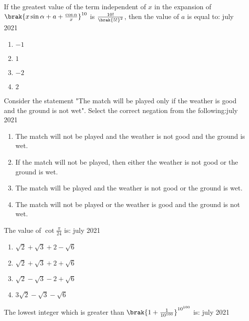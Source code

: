     \item If the greatest value of the term independent of $x$ in the expansion of $\brak{x\sin\alpha+a+\frac{\cos\alpha}{x}}^{10}$ is $\frac{10!}{\brak{5!}^2}$, then the value of $a$ is equal to: \hfill{july 2021}
    
        \begin{multicols}{4}
        \begin{enumerate}
        \item $-1$
        \item $1$
        \item $-2$
        \item $2$
        \end{enumerate}
        \end{multicols}

    \item Consider the statement "The match will be played only if the weather is good and the ground is not wet". Select the correct negation from the following:\hfill{july 2021}
    
   
        \begin{enumerate}
        \item The match will not be played and the weather is not good and the ground is wet.
        \item If the match will not be played, then either the weather is not good or the ground is wet.
        \item The match will be played and the weather is not good or the ground is wet.
        \item The match will not be played or the weather is good and the ground is not wet.
        \end{enumerate}
        

    \item The value of $\cot\frac{\pi}{24}$ is: \hfill{july 2021}
        
        \begin{enumerate}
        \item $\sqrt{2}+\sqrt{3}+2-\sqrt{6}$
        \item $\sqrt{2}+\sqrt{3}+2+\sqrt{6}$
        \item $\sqrt{2}-\sqrt{3}-2+\sqrt{6}$
        \item $3\sqrt{2}-\sqrt{3}-\sqrt{6}$
        \end{enumerate}
        
    \item The lowest integer which is greater than $\brak{1+\frac{1}{10^{100}}}^{10^{100}}$ is: \hfill{july 2021}

